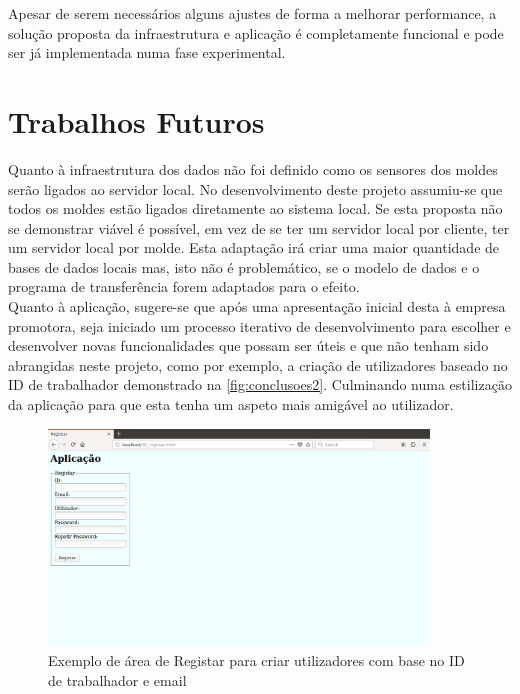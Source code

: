 \documentclass[11pt,twoside,a4paper]{report}
\begin{document}
Apesar de serem necessários alguns ajustes de forma a melhorar performance, a solução proposta da infraestrutura e aplicação é completamente funcional e pode ser já implementada numa fase experimental.

\section{Trabalhos Futuros}
Quanto à infraestrutura dos dados não foi definido como os sensores dos moldes serão ligados ao servidor local. No desenvolvimento deste projeto assumiu-se que todos os moldes estão ligados diretamente ao sistema local. Se esta proposta não se demonstrar viável é possível, em vez de se ter um servidor local por cliente, ter um servidor local por molde. Esta adaptação irá criar uma maior quantidade de bases de dados locais mas, isto não é problemático, se o modelo de dados e o programa de transferência forem adaptados para o efeito.\\
Quanto à aplicação, sugere-se que após uma apresentação inicial desta à empresa promotora, seja iniciado um processo iterativo de desenvolvimento para escolher e desenvolver novas funcionalidades que possam ser úteis e que não tenham sido abrangidas neste projeto, como por exemplo, a criação de utilizadores baseado no ID de trabalhador demonstrado na \autoref{fig:conclusoes2}. Culminando numa estilização da aplicação para que esta tenha um aspeto mais amigável ao utilizador.
\begin{figure}[H]
	\begin{center}
		\includegraphics[width=0.9\textwidth]{futuro02} %
		\caption{Exemplo de área de Registar para criar utilizadores com base no ID de trabalhador e email}
		\label{fig:conclusoes2}
	\end{center}
\end{figure}
\vspace{-.82cm}
\end{document}
